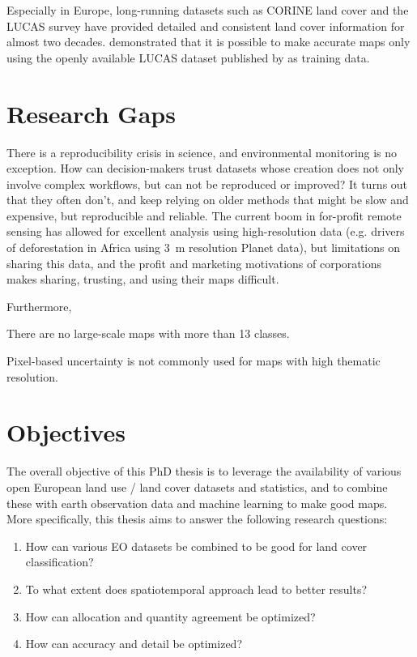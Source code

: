     Especially in Europe, long-running datasets such as CORINE land cover and the LUCAS survey have provided detailed and consistent land cover information for almost two decades. \citet{pflugmacher2019mapping} demonstrated that it is possible to make accurate maps only using the openly available LUCAS dataset published by \citet{dandrimont2020harmonised} as training data.


\section{Research Gaps}

    There is a reproducibility crisis in science, and environmental monitoring is no exception. How can decision-makers trust datasets whose creation does not only involve complex workflows, but can not be reproduced or improved? It turns out that they often don't, and keep relying on older methods that might be slow and expensive, but reproducible and reliable. The current boom in for-profit remote sensing has allowed for excellent analysis using high-resolution data (e.g. drivers of deforestation in Africa \citep{masolele2024mapping} using 3~m resolution Planet data), but limitations on sharing this data, and the profit and marketing motivations of corporations makes sharing, trusting, and using their maps difficult.

    Furthermore, 

    There are no large-scale maps with more than 13 classes.

    Pixel-based uncertainty is not commonly used for maps with high thematic resolution.





\section{Objectives}

The overall objective of this PhD thesis is to leverage the availability of various open European land use / land cover datasets and statistics, and to combine these with earth observation data and machine learning to make good maps. More specifically, this thesis aims to answer the following research questions:

\begin{enumerate}
    \item How can various EO datasets be combined to be good for land cover classification?
    \item To what extent does spatiotemporal approach lead to better results?
    \item How can allocation and quantity agreement be optimized?
    \item How can accuracy and detail be optimized?
\end{enumerate}



